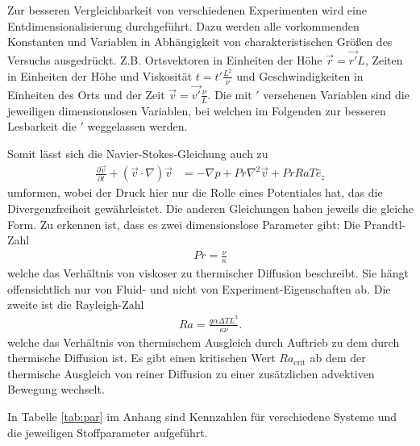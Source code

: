 \documentclass[12pt,a4paper,titlepage,headinclude]{scrartcl}
\numberwithin{equation}{subsection}
\begin{document}
Zur besseren Vergleichbarkeit von verschiedenen Experimenten wird eine Entdimensionalisierung durchgeführt.
Dazu werden alle vorkommenden Konstanten und Variablen in Abhängigkeit von charakteristischen Größen des Versuchs ausgedrückt.
Z.B. Ortsvektoren in Einheiten der Höhe $\vec{r}=\vec{r'} L$, Zeiten in Einheiten der Höhe und Viskosität $t=t' \frac{L^2}{\nu}$ und Geschwindigkeiten in Einheiten des Orts und der Zeit $\vec{v}=\vec{v'}\frac{\nu}{L}$.
Die mit $'$ versehenen Variablen sind die jeweiligen dimensionslosen Variablen, bei welchen im Folgenden zur besseren Lesbarkeit die $'$ weggelassen werden.

Somit lässt sich die Navier-Stokes-Gleichung auch zu
\begin{align}
	\frac{\partial \vec{v}}{\partial t}+\left( \vec{v}\cdot\nabla \right)\vec{v} &= -\nabla p + Pr\nabla^2\vec{v}+PrRaT\hat{e}_z
\end{align}
umformen, wobei der Druck hier nur die Rolle eines Potentiales hat, das die Divergenzfreiheit gewährleistet.
Die anderen Gleichungen haben jeweils die gleiche Form.
Zu erkennen ist, dass es zwei dimensionslose Parameter gibt:
Die Prandtl-Zahl
\begin{align}
	Pr=\frac{\nu}{\kappa}\label{eq:Pr}
\end{align}
welche das Verhältnis von viskoser zu thermischer Diffusion beschreibt.
Sie hängt offensichtlich nur von Fluid- und nicht von Experiment-Eigenschaften ab.
Die zweite ist die Rayleigh-Zahl
\begin{align}
	Ra=\frac{g\alpha\Delta T L^3}{\kappa\nu}.\label{eq:Ra}
\end{align}
welche das Verhältnis von thermischem Ausgleich durch Auftrieb zu dem durch thermische Diffusion ist.
Es gibt einen kritischen Wert $Ra_\text{crit}$ ab dem der thermische Ausgleich von reiner Diffusion zu einer zusätzlichen advektiven Bewegung wechselt.

In Tabelle \ref{tab:par} im Anhang sind Kennzahlen für verschiedene Systeme und die jeweiligen Stoffparameter aufgeführt.
\end{document}
